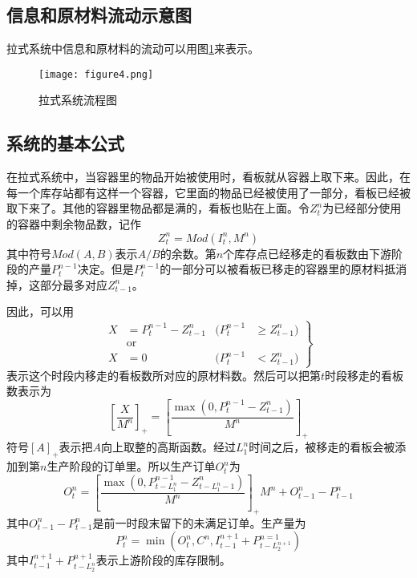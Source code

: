 \subsection{信息和原材料流动示意图}

拉式系统中信息和原材料的流动可以用图\ref{fig:flow}来表示。

\begin{figure}[htbp]
\centering
\texttt{[image: figure4.png]}
\caption{拉式系统流程图}
\label{fig:flow}
\end{figure}

\subsection{系统的基本公式}

在拉式系统中，当容器里的物品开始被使用时，看板就从容器上取下来。因此，在每一个库存站都有这样一个容器，它里面的物品已经被使用了一部分，看板已经被取下来了。其他的容器里物品都是满的，看板也贴在上面。令$Z_t^n$为已经部分使用的容器中剩余物品数，记作
\[
Z_t^n=Mod(I_t^n, M^n)
\]
其中符号$Mod(A,B)$表示$A/B$的余数。第$n$个库存点已经移走的看板数由下游阶段的产量$P_t^{n-1}$决定。但是$P_t^{n-1}$的一部分可以被看板已移走的容器里的原材料抵消掉，这部分最多对应$Z_{t-1}^n$。

因此，可以用
\begin{equation}
\left.
\begin{aligned}
X &= P_t^{n-1}-Z_{t-1}^n & (P_t^{n-1} &\geqslant Z_{t-1}^n) \\
&\text{or} & \\
X &= 0 & (P_t^{n-1} &< Z_{t-1}^n)
\end{aligned}
\right\}
\label{eq:1}
\end{equation}
表示这个时段内移走的看板数所对应的原材料数。然后可以把第$t$时段移走的看板数表示为
\[
\left[\frac{X}{M^n}\right]_+ = \left[\frac{\max(0,P_t^{n-1}-Z_{t-1}^n)}{M^n}\right]_+
\]
符号$[A]_+$表示把$A$向上取整的高斯函数。经过$L_1^n$时间之后，被移走的看板会被添加到第$n$生产阶段的订单里。所以生产订单$O_t^n$为
\begin{equation}
O_t^n = \left[\frac{\max(0,P_{t-L_1^n}^{n-1}-Z_{t-L_1^n-1}^n)}{M^n}\right]_+M^n + O_{t-1}^n - P_{t-1}^n
\label{eq:2}
\end{equation}
其中$O_{t-1}^n - P_{t-1}^n$是前一时段末留下的未满足订单。生产量为
\begin{equation}
P_t^n = \min(O_t^n,C^n,I_{t-1}^{n+1}+P_{t-L_2^{n+1}}^{n=1})
\label{eq:3}
\end{equation}
其中$I_{t-1}^{n+1}+P_{t-L_2^n}^{n+1}$表示上游阶段的库存限制。


